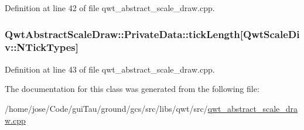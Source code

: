 Definition at line 42 of file qwt\-\_\-abstract\-\_\-scale\-\_\-draw.\-cpp.

\hypertarget{class_qwt_abstract_scale_draw_1_1_private_data_a9ae84ca2bea8f90a4b3b006909e614b6}{
\subsubsection[{tick\-Length}]{ Qwt\-Abstract\-Scale\-Draw\-::\-Private\-Data\-::tick\-Length\mbox{[}{\bf Qwt\-Scale\-Div\-::\-N\-Tick\-Types}\mbox{]}}}\label{class_qwt_abstract_scale_draw_1_1_private_data_a9ae84ca2bea8f90a4b3b006909e614b6}


Definition at line 43 of file qwt\-\_\-abstract\-\_\-scale\-\_\-draw.\-cpp.



The documentation for this class was generated from the following file\-:\begin{DoxyCompactItemize}
\item 
/home/jose/\-Code/gui\-Tau/ground/gcs/src/libs/qwt/src/\hyperlink{qwt__abstract__scale__draw_8cpp}{qwt\-\_\-abstract\-\_\-scale\-\_\-draw.\-cpp}\end{DoxyCompactItemize}
